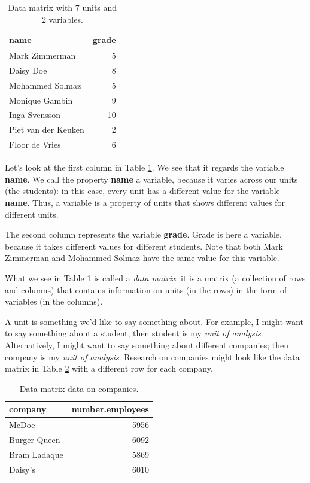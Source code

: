 \documentclass[]{report}\usepackage[]{graphicx}\usepackage[]{color}
\begin{document}
\begin{table}[ht]
\centering
\caption{Data matrix with 7 units and 2 variables.} 
\label{tab:data_1}
\begin{tabular}{lr}
  \hline
name & grade \\ 
  \hline
Mark Zimmerman & 5 \\ 
  Daisy Doe & 8 \\ 
  Mohammed Solmaz & 5 \\ 
  Monique Gambin & 9 \\ 
  Inga Svensson & 10 \\ 
  Piet van der Keuken & 2 \\ 
  Floor de Vries & 6 \\ 
   \hline
\end{tabular}
\end{table}


Let's look at the first column in Table \ref{tab:data_1}. We see that it regards the variable \textbf{name}. We call the property \textbf{name} a variable, because it varies across our units (the students): in this case, every unit has a different value for the variable \textbf{name}. Thus, a variable is a property of units that shows different values for different units.

The second column represents the variable \textbf{grade}. Grade is here a variable, because it takes different values for different students. Note that both Mark Zimmerman and Mohammed Solmaz have the same value for this variable.

What we see in Table \ref{tab:data_1} is called a \textit{data matrix}: it is a matrix (a collection of rows and columns) that contains information on units (in the rows) in the form of variables (in the columns).

A unit is something we'd like to say something about. For example, I might want to say something about a student, then student is my \textit{unit of analysis}. Alternatively, I might want to say something about different companies; then company is my \textit{unit of analysis}. Research on companies might look like the data matrix in Table \ref{tab:data_2} with a different row for each company.

\begin{table}[ht]
\centering
\caption{Data matrix data on companies.} 
\label{tab:data_2}
\begin{tabular}{lr}
  \hline
company & number.employees \\ 
  \hline
McDoe & 5956 \\ 
  Burger Queen & 6092 \\ 
  Bram Ladaque & 5869 \\ 
  Daisy's & 6010 \\ 
   \hline
\end{tabular}
\end{table}
\end{document}
